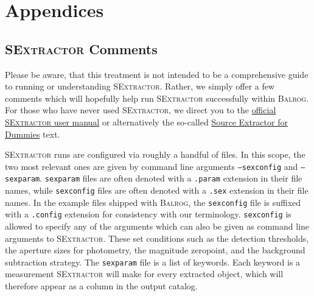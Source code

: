 \documentclass[11pt]{book}
\newcommand{\codett}[1]{\texttt{#1}}
\newcommand{\balrog}{\textsc{Balrog}}
\newcommand{\sex}{\textsc{SExtractor}}
\newcommand{\opt}[1]{\codett{--#1}}
\begin{document}



\appendix
\chapter{Appendices}
\label{sec:appendix}

\section{\sex{} Comments}
\label{sec:quicksex}

Please be aware, that this treatment is not intended to be a comprehensive guide 
to running or understanding \sex{}.
Rather, we simply offer a few comments which will hopefully help run \sex{} successfully within \balrog{}.
For those who have never used \sex{}, we direct you to the
\href{https://www.astromatic.net/pubsvn/software/sextractor/trunk/doc/sextractor.pdf}{official \sex{} user manual} 
or alternatively the so-called
\href{http://astroa.physics.metu.edu.tr/MANUALS/sextractor/Guide2source\_extractor.pdf}{Source Extractor for Dummies} text.

\sex{} runs are configured via roughly a handful of files. 
In this scope, the two most relevant ones are given by command line arguments \opt{sexconfig}
and \opt{sexparam}. 
\codett{sexparam} files are often denoted with a \codett{.param} extension in their file names,
while \codett{sexconfig} files are often denoted with a \codett{.sex} extension in their file names.
In the example files shipped with \balrog{}, the \codett{sexconfig}
file is suffixed with a \codett{.config} extension for consistency with our terminology.
\codett{sexconfig} is allowed to specify any of the arguments which can
also be given as command line arguments to \sex{}.
These set conditions such as the detection thresholds,
the aperture sizes for photometry, the magnitude zeropoint,
and the background subtraction strategy.
The \codett{sexparam} file is a list of keywords.
Each keyword is a measurement \sex{} will make for every extracted object, which will therefore
appear as a column in the output catalog.
\end{document}
